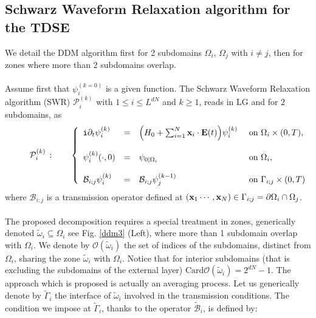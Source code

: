 \subsection{Schwarz Waveform Relaxation algorithm for the TDSE}\label{SWR1}
We detail the DDM algorithm first for 2 subdomains $\Omega_{i}$, $\Omega_j$ with $i\neq j$, then for zones where more than $2$ subdomains overlap.  \\
\\
 Assume first that $\psi_i^{(k=0)}$ is a given function. The Schwarz Waveform Relaxation algorithm (SWR) $\mathcal{P}_i^{(k)}$ with $1\leq i\leq L^{dN}$ and $k \geq 1$, reads in LG and for $2$ subdomains, as 
\begin{eqnarray}\label{S1}
\hspace*{1cm}\mathcal{P}_i^{(k)} \,: \qquad \left\{
\begin{array}{lcll}
{\tt i}\partial_t \psi_i^{(k)} &  = & \Big(H_0 + \sum_{i=1}^N{\bf x}_i\cdot {\bf E}(t)\Big)\psi_i^{(k)} & \hbox{ on } \Omega_i \times (0,T),\\
\\
\psi_i^{(k)}(\cdot,0) &  = & \psi_{0|\Omega_i} & \hbox{ on } \Omega_i,\\
\\
\mathcal{B}_{i;j}\psi_i^{(k)} & = & \mathcal{B}_{i;j}\psi_j^{(k-1)} &  \hbox{ on } \Gamma_{i;j}\times (0,T)
\end{array}
\right.
\end{eqnarray}
where $\mathcal{B}_{i;j}$ is a transmission operator defined at $({\bf x}_1\cdots,{\bf x}_N) \in \Gamma_{i;j}=\partial \Omega_i \cap \Omega_j$.  \\
\\
 The proposed decomposition requires a special treatment in zones, generically denoted $\widetilde{\omega}_i \subseteq \Omega_i$ see Fig. \ref{ddm3} (Left), where more than 1 subdomain overlap with $\Omega_i$. We denote by $\mathcal{O}(\widetilde{\omega}_i)$ the set of indices of the subdomains, distinct from $\Omega_i$, sharing the zone $\widetilde{\omega}_{i}$ with $\Omega_i$.  Notice that for interior subdomains (that is excluding the subdomains of the external layer) $\textrm{Card}\mathcal{O}(\widetilde{\omega}_i)=2^{dN}-1$.  The approach which is proposed is actually an averaging process. Let us generically denote by $\widetilde{\Gamma}_{i}$ the interface of $\widetilde{\omega}_i$ involved in the transmission conditions. The condition we impose at $\widetilde{\Gamma}_i$, thanks to the operator $\widetilde{\mathcal{B}}_i$, is defined by:
